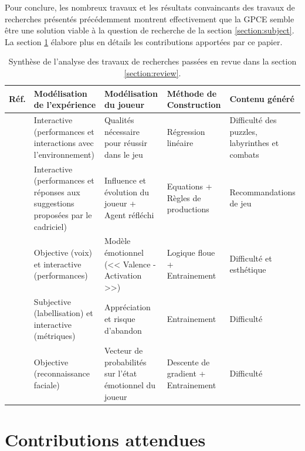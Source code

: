 \documentclass[a4paper,11pt]{article}
\begin{document}
        Pour conclure, les nombreux travaux et les résultats convaincants des travaux de recherches présentés précédemment montrent effectivement que la GPCE semble être une solution viable à la question de recherche de la section \ref{section:subject}.
        La section \ref{section:contributions} élabore plus en détails les contributions apportées par ce papier.

      \begin{table}
        \footnotesize
        \begin{tabularx}{\linewidth}{|p{0.7cm}|Y|Y|Y|Y|}
          \hline
            \textbf{Réf.} & \textbf{Modélisation de l'expérience} & \textbf{Modélisation du joueur} & \textbf{Méthode de Construction} & \textbf{Contenu généré} \\
          \hline
            \cite{ref:Heijne} & Interactive (performances et interactions avec l'environnement) & Qualités nécessaire pour réussir dans le jeu & Régression linéaire & Difficulté des puzzles, labyrinthes et combats \\
          \hline
            \cite{ref:Daylamani} & Interactive (performances et réponses aux suggestions proposées par le cadriciel) & Influence et évolution du joueur + Agent réfléchi & Equations + Règles de productions & Recommandations de jeu \\
          \hline
            \cite{ref:Lara} & Objective (voix) et interactive (performances) & Modèle émotionnel (<< Valence - Activation >>) & Logique floue + Entrainement & Difficulté et esthétique \\
          \hline
            \cite{ref:Bakkes} & Subjective (labellisation) et interactive (métriques) & Appréciation et risque d'abandon & Entrainement & Difficulté \\
          \hline
            \cite{ref:Blom} & Objective (reconnaissance faciale) & Vecteur de probabilités sur l'état émotionnel du joueur & Descente de gradient + Entrainement & Difficulté \\
          \hline
        \end{tabularx}
        \caption{Synthèse de l'analyse des travaux de recherches passées en revue dans la section \ref{section:review}.}
        \label{table:stateoftheart}
      \end{table}

      \section{Contributions attendues}\label{section:contributions}
      
\end{document}
